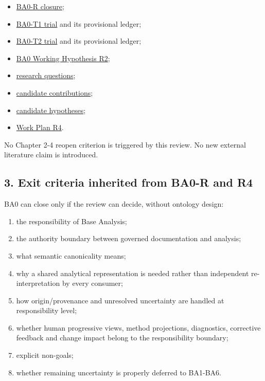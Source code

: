 \documentclass[
  10pt,
]{article}
\providecommand{\tightlist}{%
  \setlength{\itemsep}{0pt}\setlength{\parskip}{0pt}}
\begin{document}
\begin{itemize}
\tightlist
\item
  \href{../literature/syntheses/BA0_R_CLOSURE_R1.md}{BA0-R closure};
\item
  \href{BA0_T1_FR3_4_APPLICATION_TRIAL_R1.md}{BA0-T1 trial} and its
  provisional ledger;
\item
  \href{BA0_T2_ANALYSIS_CONSUMPTION_TEACHABILITY_GOVERNED_FEEDBACK_TRIAL_R1.md}{BA0-T2
  trial} and its provisional ledger;
\item
  \href{BA0_BASE_ANALYSIS_WORKING_HYPOTHESIS_R2.md}{BA0 Working
  Hypothesis R2};
\item
  \href{../research/research-questions.md}{research questions};
\item
  \href{../research/contributions.md}{candidate contributions};
\item
  \href{../research/hypotheses.md}{candidate hypotheses};
\item
  \href{DDTA_RESEARCH_WORK_PLAN_AFTER_DOCUMENTATION_CLOSURE_R4.md}{Work
  Plan R4}.
\end{itemize}

No Chapter 2-4 reopen criterion is triggered by this review. No new
external literature claim is introduced.

\subsection{3. Exit criteria inherited from BA0-R and
R4}\label{exit-criteria-inherited-from-ba0-r-and-r4}

BA0 can close only if the review can decide, without ontology design:

\begin{enumerate}
\def\labelenumi{\arabic{enumi}.}
\tightlist
\item
  the responsibility of Base Analysis;
\item
  the authority boundary between governed documentation and analysis;
\item
  what semantic canonicality means;
\item
  why a shared analytical representation is needed rather than
  independent re-interpretation by every consumer;
\item
  how origin/provenance and unresolved uncertainty are handled at
  responsibility level;
\item
  whether human progressive views, method projections, diagnostics,
  corrective feedback and change impact belong to the responsibility
  boundary;
\item
  explicit non-goals;
\item
  whether remaining uncertainty is properly deferred to BA1-BA6.
\end{enumerate}
\end{document}
